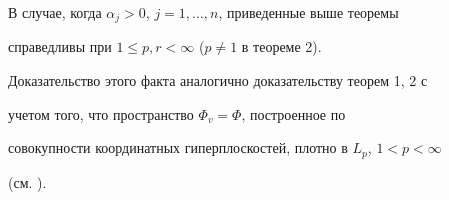 \begin{note}


В случае, когда $\alpha_j>0$, $j=1,\dotsc,n$, приведенные выше теоремы


справедливы при $1\le p,r<\infty$ ($p\ne 1$ в теореме 2).


Доказательство этого факта аналогично доказательству теорем 1, 2 с


учетом того, что пространство $\Phi_v=\Phi$, построенное по


совокупности координатных гиперплоскостей, плотно в $L_p$, $1<p<\infty$


(см. \cite{2}).


\end{note}





